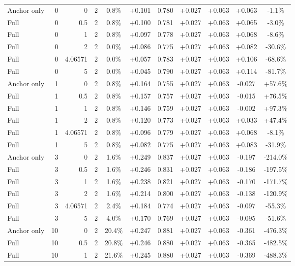 \begin{table}[htbp]
\begin{tabular}{lrrrccccccc}
Anchor only & 0 & 0 & 2 & 0.8\% & +0.101 & 0.780 & +0.027 & +0.063 & +0.063 & -1.1\% \\
Full & 0 & 0.5 & 2 & 0.8\% & +0.100 & 0.781 & +0.027 & +0.063 & +0.065 & -3.0\% \\
Full & 0 & 1 & 2 & 0.8\% & +0.097 & 0.778 & +0.027 & +0.063 & +0.068 & -8.6\% \\
Full & 0 & 2 & 2 & 0.0\% & +0.086 & 0.775 & +0.027 & +0.063 & +0.082 & -30.6\% \\
Full & 0 & 4.06571 & 2 & 0.0\% & +0.057 & 0.783 & +0.027 & +0.063 & +0.106 & -68.6\% \\
Full & 0 & 5 & 2 & 0.0\% & +0.045 & 0.790 & +0.027 & +0.063 & +0.114 & -81.7\% \\
Anchor only & 1 & 0 & 2 & 0.8\% & +0.164 & 0.755 & +0.027 & +0.063 & -0.027 & +57.6\% \\
Full & 1 & 0.5 & 2 & 0.8\% & +0.157 & 0.757 & +0.027 & +0.063 & -0.015 & +76.5\% \\
Full & 1 & 1 & 2 & 0.8\% & +0.146 & 0.759 & +0.027 & +0.063 & -0.002 & +97.3\% \\
Full & 1 & 2 & 2 & 0.8\% & +0.120 & 0.773 & +0.027 & +0.063 & +0.033 & +47.4\% \\
Full & 1 & 4.06571 & 2 & 0.8\% & +0.096 & 0.779 & +0.027 & +0.063 & +0.068 & -8.1\% \\
Full & 1 & 5 & 2 & 0.8\% & +0.082 & 0.775 & +0.027 & +0.063 & +0.083 & -31.9\% \\
Anchor only & 3 & 0 & 2 & 1.6\% & +0.249 & 0.837 & +0.027 & +0.063 & -0.197 & -214.0\% \\
Full & 3 & 0.5 & 2 & 1.6\% & +0.246 & 0.831 & +0.027 & +0.063 & -0.186 & -197.5\% \\
Full & 3 & 1 & 2 & 1.6\% & +0.238 & 0.821 & +0.027 & +0.063 & -0.170 & -171.7\% \\
Full & 3 & 2 & 2 & 1.6\% & +0.214 & 0.800 & +0.027 & +0.063 & -0.138 & -120.9\% \\
Full & 3 & 4.06571 & 2 & 2.4\% & +0.184 & 0.774 & +0.027 & +0.063 & -0.097 & -55.3\% \\
Full & 3 & 5 & 2 & 4.0\% & +0.170 & 0.769 & +0.027 & +0.063 & -0.095 & -51.6\% \\
Anchor only & 10 & 0 & 2 & 20.4\% & +0.247 & 0.881 & +0.027 & +0.063 & -0.361 & -476.3\% \\
Full & 10 & 0.5 & 2 & 20.8\% & +0.246 & 0.880 & +0.027 & +0.063 & -0.365 & -482.5\% \\
Full & 10 & 1 & 2 & 21.6\% & +0.245 & 0.880 & +0.027 & +0.063 & -0.369 & -488.3\% \\

\end{tabular}
\end{table}

